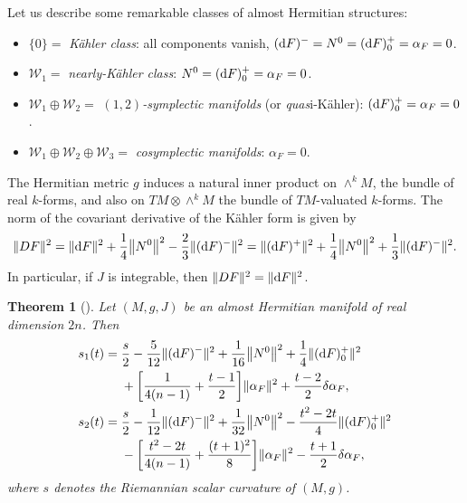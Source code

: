 \documentclass[10pt,a4paper]{amsart}
\numberwithin{equation}{section}
\newtheorem{Theorem}{Theorem}[section]
\begin{document}
Let us describe some remarkable classes of almost Hermitian structures:
\begin{itemize}\itemsep=0pt

\item $\{0\}=$ {\em K\"ahler class}: all components vanish, $({\rm d}F)^{-}= N^{0}=({\rm d}F)^{+}_{0}=\alpha_{F}=0$.

\item $\mathcal{W}_{1}=$ {\em nearly-K\"ahler class}: $N^{0} = ({\rm d}F)^{+}_{0}= \alpha_{F}=0$.

\item $\mathcal{W}_{1}\oplus \mathcal{W}_{2}=$ {\em $(1,2)$-symplectic manifolds} (or {\it quas}i-K\"ahler): $({\rm d}F)^{+}_{0}=\alpha_{F}=0$.

\item $\mathcal{W}_{1}\oplus \mathcal{W}_{2}\oplus \mathcal{W}_{3}=$ {\em cosymplectic manifolds}: $\alpha_{F}=0$.
\end{itemize}

The Hermitian metric $g$ induces a natural inner product on $\wedge^{k}M$, the bundle of real $k$-forms, and also on $TM\otimes \wedge^{k}M$ the bundle of $TM$-valuated $k$-forms. The norm of the covariant derivative of the K\"ahler form is given by
\begin{align*}
\|DF\|^{2}=\|{\rm d}F\|^{2}+\dfrac{1}{4}\big\|N^{0}\big\|^{2}-\dfrac{2}{3}\|({\rm d}F)^{-}\|^{2}
=\|({\rm d}F)^{+}\|^{2}+\dfrac{1}{4}\big\|N^{0}\big\|^{2}+\dfrac{1}{3}\|({\rm d}F)^{-}\|^{2}.
\end{align*}
In particular, if $J$ is integrable, then $\|DF\|^{2}=\|{\rm d}F\|^{2}$.

\begin{Theorem}[{\cite[Theorem 4.3]{fu}}]\label{teo1}
Let $(M,g,J)$ be an almost Hermitian manifold of real dimension $2n$. Then
\begin{align*}
s_{1}(t)={}&\dfrac{s}{2}-\dfrac{5}{12}\|({\rm d}F)^{-}\|^{2}+\dfrac{1}{16}\big\|N^{0}\big\|^{2}+\dfrac{1}{4}\|({\rm d}F)_{0}^{+}\|^{2}
\\
&+\bigg[\dfrac{1}{4(n-1)}+\dfrac{t-1}{2}\bigg]\|\alpha_{F}\|^{2}+\dfrac{t-2}{2}\delta\alpha_{F},
\\
s_{2}(t)={}&\frac{s}{2}-\frac{1}{12}\|({\rm d}F)^{-}\|^{2}+\frac{1}{32}\big\|N^{0}\big\|^{2}-\dfrac{t^{2}-2t}{4}\|({\rm d}F)_{0}^{+}\|^{2}
\\
&-\bigg[\dfrac{t^{2}-2t}{4(n-1)}+\dfrac{(t+1)^{2}}{8}\bigg]\|\alpha_{F}\|^{2}-\dfrac{t+1}{2}\delta\alpha_{F},
\end{align*}
where $s$ denotes the Riemannian scalar curvature of $(M,g)$.
\end{Theorem}
\end{document}

